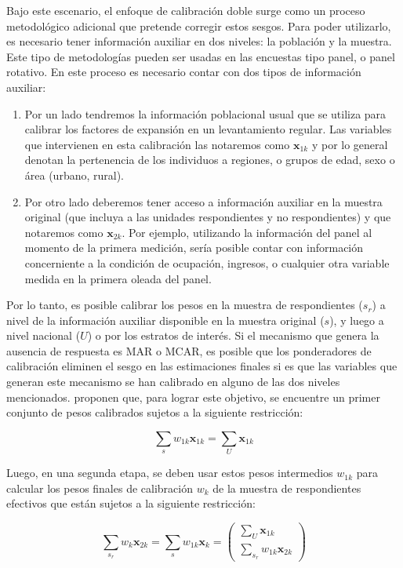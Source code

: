 \documentclass[
  12pt,
]{book}
\providecommand{\tightlist}{%
  \setlength{\itemsep}{0pt}\setlength{\parskip}{0pt}}
\begin{document}
Bajo este escenario, el enfoque de calibración doble surge como un proceso metodológico adicional que pretende corregir estos sesgos. Para poder utilizarlo, es necesario tener información auxiliar en dos niveles: la población y la muestra. Este tipo de metodologías pueden ser usadas en las encuestas tipo panel, o panel rotativo. En este proceso es necesario contar con dos tipos de información auxiliar:

\begin{enumerate}
\def\labelenumi{\arabic{enumi}.}
\tightlist
\item
  Por un lado tendremos la información poblacional usual que se utiliza para calibrar los factores de expansión en un levantamiento regular. Las variables que intervienen en esta calibración las notaremos como \(\boldsymbol{x}_{1k}\) y por lo general denotan la pertenencia de los individuos a regiones, o grupos de edad, sexo o área (urbano, rural).
\item
  Por otro lado deberemos tener acceso a información auxiliar en la muestra original (que incluya a las unidades respondientes y no respondientes) y que notaremos como \(\boldsymbol{x}_{2k}\). Por ejemplo, utilizando la información del panel al momento de la primera medición, sería posible contar con información concerniente a la condición de ocupación, ingresos, o cualquier otra variable medida en la primera oleada del panel.
\end{enumerate}

Por lo tanto, es posible calibrar los pesos en la muestra de respondientes (\(s_r\)) a nivel de la información auxiliar disponible en la muestra original (\(s\)), y luego a nivel nacional (\(U\)) o por los estratos de interés. Si el mecanismo que genera la ausencia de respuesta es MAR o MCAR, es posible que los ponderadores de calibración eliminen el sesgo en las estimaciones finales si es que las variables que generan este mecanismo se han calibrado en alguno de las dos niveles mencionados. \citet{Sarndal_Lundstrom_2006} proponen que, para lograr este objetivo, se encuentre un primer conjunto de pesos calibrados sujetos a la siguiente restricción:

\[
\sum_{s}w_{1k}\boldsymbol{x}_{1k} = \sum_{U}\boldsymbol{x}_{1k}
\]

Luego, en una segunda etapa, se deben usar estos pesos intermedios \(w_{1k}\) para calcular los pesos finales de calibración \(w_{k}\) de la muestra de respondientes efectivos que están sujetos a la siguiente restricción:

\[
\sum_{s_r}w_{k}\boldsymbol{x}_{2k} = \sum_{s}w_{1k}\boldsymbol{x}_{k} = 
\begin{pmatrix}
\sum_{U}\boldsymbol{x}_{1k}\\
\sum_{s_r}w_{1k}\boldsymbol{x}_{2k}
\end{pmatrix}
\]
\end{document}
